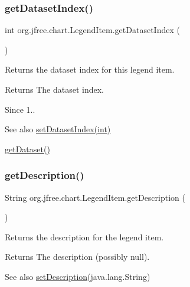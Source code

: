 \subsubsection{\texorpdfstring{get\+Dataset\+Index()}{getDatasetIndex()}}
{\footnotesize\ttfamily int org.\+jfree.\+chart.\+Legend\+Item.\+get\+Dataset\+Index (\begin{DoxyParamCaption}{ }\end{DoxyParamCaption})}

Returns the dataset index for this legend item.

\begin{DoxyReturn}{Returns}
The dataset index.
\end{DoxyReturn}
\begin{DoxySince}{Since}
1..
\end{DoxySince}
\begin{DoxySeeAlso}{See also}
\mbox{\hyperlink{classorg_1_1jfree_1_1chart_1_1_legend_item_a34b68265023efe9e950bb9fa8cc927dc}{set\+Dataset\+Index(int)}} 

\mbox{\hyperlink{classorg_1_1jfree_1_1chart_1_1_legend_item_a5213895f13ab94372d048ea13d2f0146}{get\+Dataset()}} 
\end{DoxySeeAlso}
\mbox{\label{classorg_1_1jfree_1_1chart_1_1_legend_item_ae9145881d91551b169d3e47ebbe024a4}} 
\subsubsection{\texorpdfstring{get\+Description()}{getDescription()}}
{\footnotesize\ttfamily String org.\+jfree.\+chart.\+Legend\+Item.\+get\+Description (\begin{DoxyParamCaption}{ }\end{DoxyParamCaption})}

Returns the description for the legend item.

\begin{DoxyReturn}{Returns}
The description (possibly {\ttfamily null}).
\end{DoxyReturn}
\begin{DoxySeeAlso}{See also}
\mbox{\hyperlink{classorg_1_1jfree_1_1chart_1_1_legend_item_a6260a832309908f4b41f005d9ace3f23}{set\+Description}}(java.\+lang.\+String) 
\end{DoxySeeAlso}
\mbox{\label{classorg_1_1jfree_1_1chart_1_1_legend_item_a409022aa47bddad9a8d58a6ed8045b71}} 
